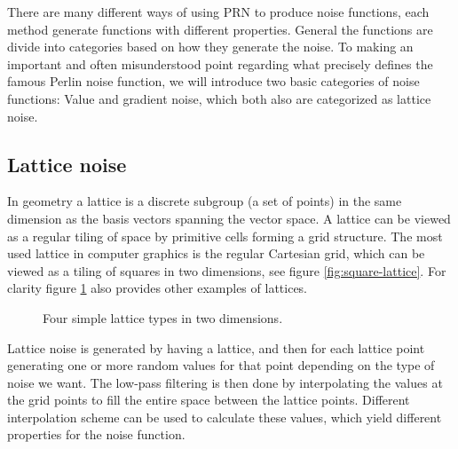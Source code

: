 There are many different ways of using PRN to produce noise functions,
each method generate functions with different properties. General the
functions are divide into categories based on how they generate the
noise. To making an important and often misunderstood point regarding
what precisely defines the famous Perlin noise function, we will
introduce two basic categories of noise functions: Value and gradient
noise, which both also are categorized as lattice noise.


\subsection{Lattice noise}
In geometry a lattice is a discrete subgroup (a set of points) in the
same dimension as the basis vectors spanning the vector space. A
lattice can be viewed as a regular tiling of space by primitive cells
forming a grid structure. The most used lattice in computer graphics is the
regular Cartesian grid, which can be viewed as a tiling of
squares in two dimensions, see figure \ref{fig:square-lattice}. For
clarity figure \ref{fig:lattices} also provides other examples of
lattices.

\begin{figure}[!h]
  \centering
  \hspace{4mm}
  \hspace{4mm}
  \hspace{4mm}
  \caption{Four simple lattice types in two dimensions.}
  \label{fig:lattices}
\end{figure}

Lattice noise is generated by having a lattice, and then for each
lattice point generating one or more random values for that point
depending on the type of noise we want.
%
The low-pass filtering is then done by interpolating the values at the
grid points to fill the entire space between the lattice
points. Different interpolation scheme can be used to calculate these
values, which yield different properties for the noise function.

